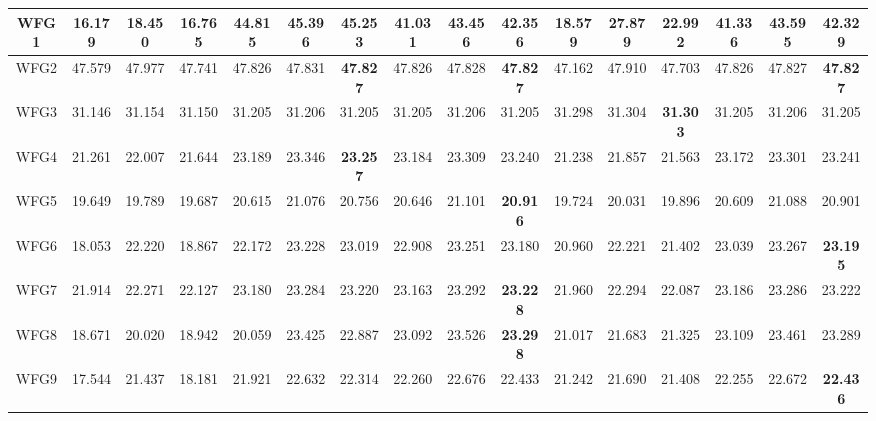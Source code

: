 \begin{table}[]
{\begin{tabular}{c|c|c|c|c|c|c|c|c|c|c|c|c|c|c|c|}
\multicolumn{1}{|c|}{WFG1} & 16.179 & 18.450 & 16.765 & 44.815 & 45.396 & \textbf{45.253} & 41.031 & 43.456 & 42.356 & 18.579 & 27.879 & 22.992 & 41.336 & 43.595 & 42.329 \\ \hline
\multicolumn{1}{|c|}{WFG2} & 47.579 & 47.977 & 47.741 & 47.826 & 47.831 & \textbf{47.827} & 47.826 & 47.828 & \textbf{47.827} & 47.162 & 47.910 & 47.703 & 47.826 & 47.827 & \textbf{47.827} \\ \hline
\multicolumn{1}{|c|}{WFG3} & 31.146 & 31.154 & 31.150 & 31.205 & 31.206 & 31.205 & 31.205 & 31.206 & 31.205 & 31.298 & 31.304 & \textbf{31.303} & 31.205 & 31.206 & 31.205 \\ \hline
\multicolumn{1}{|c|}{WFG4} & 21.261 & 22.007 & 21.644 & 23.189 & 23.346 & \textbf{23.257} & 23.184 & 23.309 & 23.240 & 21.238 & 21.857 & 21.563 & 23.172 & 23.301 & 23.241 \\ \hline
\multicolumn{1}{|c|}{WFG5} & 19.649 & 19.789 & 19.687 & 20.615 & 21.076 & 20.756 & 20.646 & 21.101 & \textbf{20.916} & 19.724 & 20.031 & 19.896 & 20.609 & 21.088 & 20.901 \\ \hline
\multicolumn{1}{|c|}{WFG6} & 18.053 & 22.220 & 18.867 & 22.172 & 23.228 & 23.019 & 22.908 & 23.251 & 23.180 & 20.960 & 22.221 & 21.402 & 23.039 & 23.267 & \textbf{23.195} \\ \hline
\multicolumn{1}{|c|}{WFG7} & 21.914 & 22.271 & 22.127 & 23.180 & 23.284 & 23.220 & 23.163 & 23.292 & \textbf{23.228} & 21.960 & 22.294 & 22.087 & 23.186 & 23.286 & 23.222 \\ \hline
\multicolumn{1}{|c|}{WFG8} & 18.671 & 20.020 & 18.942 & 20.059 & 23.425 & 22.887 & 23.092 & 23.526 & \textbf{23.298} & 21.017 & 21.683 & 21.325 & 23.109 & 23.461 & 23.289 \\ \hline
\multicolumn{1}{|c|}{WFG9} & 17.544 & 21.437 & 18.181 & 21.921 & 22.632 & 22.314 & 22.260 & 22.676 & 22.433 & 21.242 & 21.690 & 21.408 & 22.255 & 22.672 & \textbf{22.436} \\ \hline
\end{tabular}%
}
\end{table}



